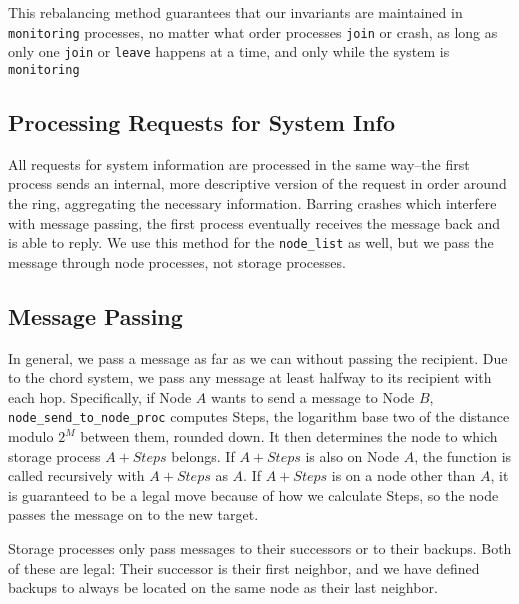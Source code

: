 \documentclass[a4paper]{article}
\begin{document}
This rebalancing method guarantees that our invariants are maintained in {\tt monitoring} processes, no matter what order processes {\tt join} or crash, as long as only one {\tt join} or {\tt leave} happens at a time, and only while the system is {\tt monitoring}

\subsection{Processing Requests for System Info}

All requests for system information are processed in the same way--the first process sends an internal, more descriptive version of the request in order around the ring, aggregating the necessary information. Barring crashes which interfere with message passing, the first process eventually receives the message back and is able to reply. We use this method for the {\tt node\_list} as well, but we pass the message through node processes, not storage processes.

\subsection{Message Passing}
In general, we pass a message as far as we can without passing the recipient. Due to the chord system, we pass any message at least halfway to its recipient with each hop. Specifically, if Node $A$ wants to send a message to Node $B$, {\tt node\_send\_to\_node\_proc} computes Steps, the logarithm base two of the distance modulo $2^{M}$ between them, rounded down. It then determines the node to which storage process $A + Steps$ belongs. If $A + Steps$ is also on Node $A$, the function is called recursively with $A + Steps$ as $A$. If $A + Steps$ is on a node other than $A$, it is guaranteed to be a legal move because of how we calculate Steps, so the node passes the message on to the new target.

Storage processes only pass messages to their successors or to their backups. Both of these are legal: Their successor is their first neighbor, and we have defined backups to always be located on the same node as their last neighbor.
\end{document}
